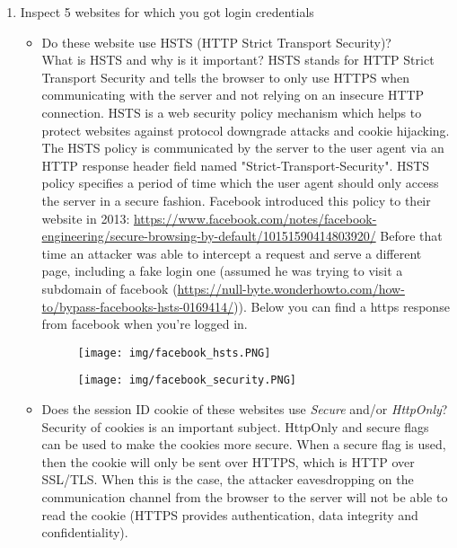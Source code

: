 \documentclass[a4paper]{article}
\begin{document}
\begin{enumerate}
\item Inspect 5 websites for which you got login credentials
	\begin{itemize}
		\item Do these website use HSTS (HTTP Strict Transport Security)?\\
		
		What is HSTS and why is it important? HSTS stands for HTTP Strict Transport Security and tells the browser to only use HTTPS when communicating with the server and not relying on an insecure HTTP connection. HSTS is a web security policy mechanism which helps to protect websites against protocol downgrade attacks and cookie hijacking. The HSTS policy is communicated by the server to the user agent via an HTTP response header field named "Strict-Transport-Security". HSTS policy specifies a period of time which the user agent should only access the server in a secure fashion. Facebook introduced this policy to their website in 2013: \url{https://www.facebook.com/notes/facebook-engineering/secure-browsing-by-default/10151590414803920/} Before that time an attacker was able to intercept a request and serve a different page, including a fake login one (assumed he was trying to visit a subdomain of facebook (\url{https://null-byte.wonderhowto.com/how-to/bypass-facebooks-hsts-0169414/})). Below you can find a https response from facebook when you're logged in.		
		
		\begin{figure}[H]
	    \centering
  	    \texttt{[image: img/facebook\_hsts.PNG]}
	    \end{figure}	
	    
	    		\begin{figure}[H]
	    \centering
  	    \texttt{[image: img/facebook\_security.PNG]}
	    \end{figure}			
		
		
		\item Does the session ID cookie of these websites use \textit{Secure} and/or \textit{HttpOnly}?\\
		
		Security of cookies is an important subject. HttpOnly and secure flags can be used to make the cookies more secure. When a secure flag is used, then the cookie will only be sent over HTTPS, which is HTTP over SSL/TLS. When this is the case, the attacker eavesdropping on the communication channel from the browser to the server will not be able to read the cookie (HTTPS provides authentication, data integrity and confidentiality).\\
		

\end{itemize}
\end{enumerate}
\end{document}
